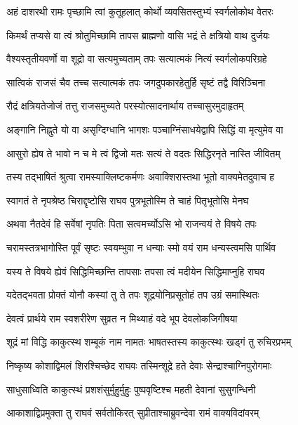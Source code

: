 \twolineshloka
{अहं दाशरथी रामः पृच्छामि त्वां कुतूहलात्}
{कोर्थो व्यवसितस्तुभ्यं स्वर्गलोकोथ वेतरः}%

\twolineshloka
{किमर्थं तप्यसे वा त्वं श्रोतुमिच्छामि तापस}
{ब्राह्मणो वासि भद्रं ते क्षत्रियो वाथ दुर्जयः}%

\twolineshloka
{वैश्यस्तृतीयवर्णो वा शूद्रो वा सत्यमुच्यताम्}
{तपः सत्यात्मकं नित्यं स्वर्गलोकपरिग्रहे}%

\twolineshloka
{सात्विकं राजसं चैव तच्च सत्यात्मकं तपः}
{जगदुपकारहेतुर्हि सृष्टं तद्वै विरिञ्चिना}%

\twolineshloka
{रौद्रं क्षत्रियतेजोजं तत्तु राजसमुच्यते}
{परस्योत्सादनार्थाय तच्चासुरमुदाहृतम्}%

\twolineshloka
{अङ्गानि निह्नुते यो वा असृग्दिग्धानि भागशः}
{पञ्चाग्निंसाधयेद्वापि सिद्धिं वा मृत्युमेव वा}%

\twolineshloka
{आसुरो ह्येष ते भावो न च मे त्वं द्विजो मतः}
{सत्यं ते वदतः सिद्धिरनृते नास्ति जीवितम्}%

\twolineshloka
{तस्य तद्भाषितं श्रुत्वा रामस्याक्लिष्टकर्मणः}
{अवाक्शिरास्तथा भूतो वाक्यमेतदुवाच ह}%

\twolineshloka
{स्वागतं ते नृपश्रेष्ठ चिराद्दृष्टोसि राघव}
{पुत्रभूतोस्मि ते चाहं पितृभूतोसि मेनघ}%

\twolineshloka
{अथवा नैतदेवं हि सर्वेषां नृपतिः पिता}
{सत्वमर्च्योऽसि भो राजन्वयं ते विषये तपः}%

\twolineshloka
{चरामस्तत्रभागोस्ति पूर्वं सृष्टः स्वयम्भुवा}
{न धन्याः स्मो वयं राम धन्यस्त्वमसि पार्थिव}%

\twolineshloka
{यस्य ते विषये ह्येवं सिद्धिमिच्छन्ति तापसाः}
{तपसा त्वं मदीयेन सिद्धिमाप्नुहि राघव}%

\twolineshloka
{यदेतद्भवता प्रोक्तं योनौ कस्यां तु ते तपः}
{शूद्रयोनिप्रसूतोहं तप उग्रं समास्थितः}%

\twolineshloka
{देवत्वं प्रार्थये राम स्वशरीरेण सुव्रत}
{न मिथ्याहं वदे भूप देवलोकजिगीषया}%

\twolineshloka
{शूद्रं मां विद्धि काकुत्स्थ शम्बूकं नाम नामतः}
{भाषतस्तस्य काकुत्स्थः खड्गं तु रुचिरप्रभम्}%

\twolineshloka
{निष्कृष्य कोशाद्विमलं शिरश्चिच्छेद राघवः}
{तस्मिन्शूद्रे हते देवाः सेन्द्राश्चाग्निपुरोगमाः}%

\twolineshloka
{साधुसाध्विति काकुत्स्थं प्रशशंसुर्मुहुर्मुहुः}
{पुष्पवृष्टिश्च महती देवानां सुसुगन्धिनी}%

\twolineshloka
{आकाशाद्विप्रमुक्ता तु राघवं सर्वतोकिरत्}
{सुप्रीताश्चाब्रुवन्देवा रामं वाक्यविदांवरम्}%

